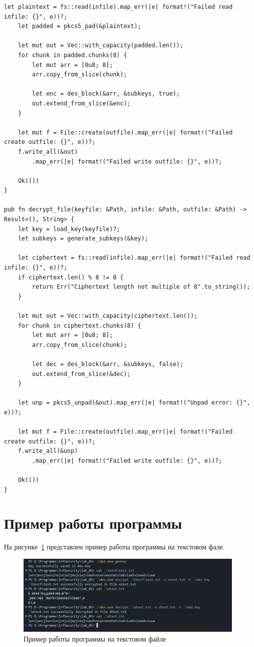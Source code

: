 \begin{center}
\begin{lstlisting}[label=lst:edcrypt,caption=Шифрование/расшифровка алгоритмом RSA]
    let plaintext = fs::read(infile).map_err(|e| format!("Failed read infile: {}", e))?;
    let padded = pkcs5_pad(&plaintext);

    let mut out = Vec::with_capacity(padded.len());
    for chunk in padded.chunks(8) {
        let mut arr = [0u8; 8];
        arr.copy_from_slice(chunk);
        
        let enc = des_block(&arr, &subkeys, true);
        out.extend_from_slice(&enc);
    }

    let mut f = File::create(outfile).map_err(|e| format!("Failed create outfile: {}", e))?;
    f.write_all(&out)
        .map_err(|e| format!("Failed write outfile: {}", e))?;

    Ok(())
}

pub fn decrypt_file(keyfile: &Path, infile: &Path, outfile: &Path) -> Result<(), String> {
    let key = load_key(keyfile)?;
    let subkeys = generate_subkeys(&key);

    let ciphertext = fs::read(infile).map_err(|e| format!("Failed read infile: {}", e))?;
    if ciphertext.len() % 8 != 0 {
        return Err("Ciphertext length not multiple of 8".to_string());
    }

    let mut out = Vec::with_capacity(ciphertext.len());
    for chunk in ciphertext.chunks(8) {
        let mut arr = [0u8; 8];
        arr.copy_from_slice(chunk);

        let dec = des_block(&arr, &subkeys, false);
        out.extend_from_slice(&dec);
    }

    let unp = pkcs5_unpad(&out).map_err(|e| format!("Unpad error: {}", e))?;

    let mut f = File::create(outfile).map_err(|e| format!("Failed create outfile: {}", e))?;
    f.write_all(&unp)
        .map_err(|e| format!("Failed write outfile: {}", e))?;

    Ok(())
}
\end{lstlisting}
\end{center}

\clearpage

\section{Пример работы программы}

На рисунке~\ref{fig:tex} представлен пример работы программы на текстовом фале.

\begin{figure}[h]
    \centering
    \includegraphics[width=1\linewidth]{images/tex.png}
    \caption{Пример работы программы на текстовом файле}
    \label{fig:tex}
\end{figure}

